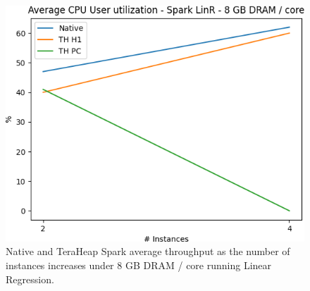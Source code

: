 \begin{figure}[thbp]
        \centering

        \includegraphics[width=\linewidth]{./fig/LINR_128_USR.png}
    \caption{Native and TeraHeap Spark average throughput
        as the number of instances increases under 8 GB DRAM / core running Linear Regression.}
        \label{fig:linr_128_usr}
\end{figure}


